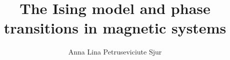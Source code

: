 \documentclass[a4paper, 11pt, twocolumn]{article}
\begin{document}
\title{The Ising model and phase transitions in magnetic systems}

\author{Anna Lina Petruseviciute Sjur}

\twocolumn[
  \begin{@twocolumnfalse}
    \maketitle
    
  \end{@twocolumnfalse}
]













%
\end{document}
